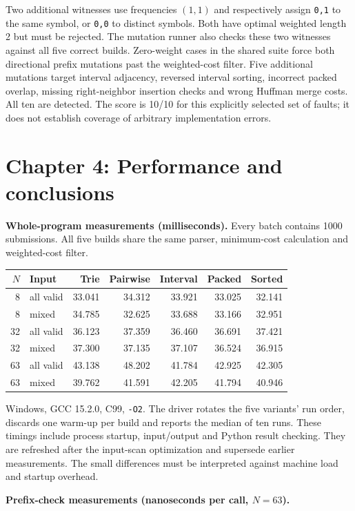 \documentclass[11pt,a4paper]{article}
\begin{document}
Two additional witnesses use frequencies $(1,1)$ and respectively assign \texttt{0,1} to the same symbol, or \texttt{0,0} to distinct symbols. Both have optimal weighted length 2 but must be rejected. The mutation runner also checks these two witnesses against all five correct builds. Zero-weight cases in the shared suite force both directional prefix mutations past the weighted-cost filter. Five additional mutations target interval adjacency, reversed interval sorting, incorrect packed overlap, missing right-neighbor insertion checks and wrong Huffman merge costs. All ten are detected. The score is 10/10 for this explicitly selected set of faults; it does not establish coverage of arbitrary implementation errors.

\clearpage
\section{Chapter 4: Performance and conclusions}
\textbf{Whole-program measurements (milliseconds).} Every batch contains 1000 submissions. All five builds share the same parser, minimum-cost calculation and weighted-cost filter.

{\small
\begin{tabular}{@{}rlrrrrr@{}}
\toprule
$N$ & Input & Trie & Pairwise & Interval & Packed & Sorted\\
\midrule
8 & all valid & 33.041 & 34.312 & 33.921 & 33.025 & 32.141\\
8 & mixed & 34.785 & 32.625 & 33.688 & 33.166 & 32.951\\
32 & all valid & 36.123 & 37.359 & 36.460 & 36.691 & 37.421\\
32 & mixed & 37.300 & 37.135 & 37.107 & 36.524 & 36.915\\
63 & all valid & 43.138 & 48.202 & 41.784 & 42.925 & 42.305\\
63 & mixed & 39.762 & 41.591 & 42.205 & 41.794 & 40.946\\
\bottomrule
\end{tabular}
}

Windows, GCC 15.2.0, C99, \texttt{-O2}. The driver rotates the five variants' run order, discards one warm-up per build and reports the median of ten runs. These timings include process startup, input/output and Python result checking. They are refreshed after the input-scan optimization and supersede earlier measurements. The small differences must be interpreted against machine load and startup overhead.

\textbf{Prefix-check measurements (nanoseconds per call, $N=63$).}
\end{document}
